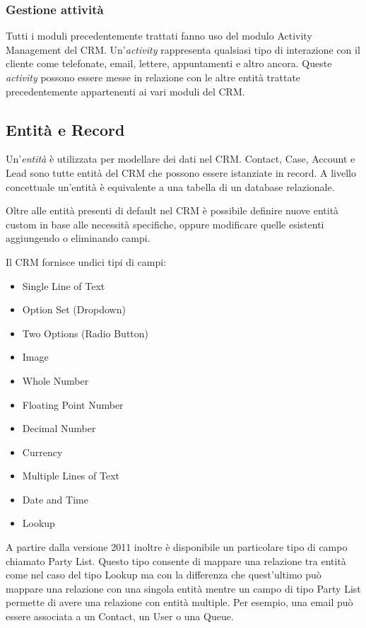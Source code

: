 \subsubsection{Gestione attività}
\label{sssec:gestione-attivita}
Tutti i moduli precedentemente trattati fanno uso del modulo Activity Management del CRM. Un'\textit{activity} rappresenta qualsiasi tipo di interazione con il cliente come telefonate, email, lettere, appuntamenti e altro ancora. Queste \textit{activity} possono essere messe in relazione con le altre entità trattate precedentemente appartenenti ai vari moduli del CRM.

\subsection{Entità e Record}
Un'\textit{entità} è utilizzata per modellare dei dati nel CRM. Contact, Case, Account e Lead sono tutte entità del CRM che possono essere istanziate in record. A livello concettuale un'entità è equivalente a una tabella di un database relazionale.

Oltre alle entità presenti di default nel CRM è possibile definire nuove entità custom in base alle necessità specifiche, oppure modificare quelle esistenti aggiungendo o eliminando campi.

Il CRM fornisce undici tipi di campi:
\begin{itemize}
  \item Single Line of Text
  \item Option Set (Dropdown)
  \item Two Options (Radio Button)
  \item Image
  \item Whole Number
  \item Floating Point Number
  \item Decimal Number
  \item Currency
  \item Multiple Lines of Text
  \item Date and Time
  \item Lookup
\end{itemize} 

A partire dalla versione 2011 inoltre è disponibile un particolare tipo di campo chiamato Party List. Questo tipo consente di mappare una relazione tra entità come nel caso del tipo Lookup ma con la differenza che quest'ultimo può mappare una relazione con una singola entità mentre un campo di tipo Party List permette di avere una relazione con entità multiple. Per esempio, una email può essere associata a un Contact, un User o una Queue.

